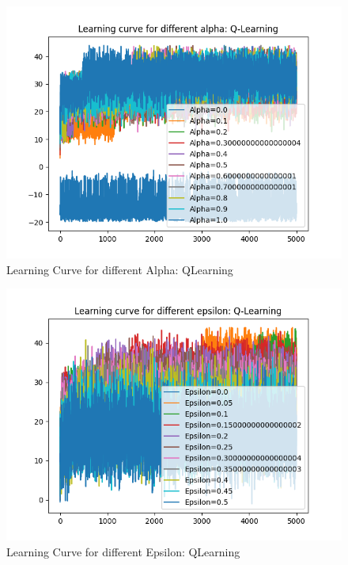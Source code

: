 \documentclass[conf]{new-aiaa}
\begin{document}
\begin{figure}[H]
\centering
\includegraphics[width=30pc]{figs/gw/alpha_sweep_qlearning.png}
\caption{Learning Curve for different Alpha: QLearning}
\label{fig_env1}
\end{figure}

\begin{figure}[H]
\centering
\includegraphics[width=30pc]{figs/gw/epsilon_sweep_qlearning.png}
\caption{Learning Curve for different Epsilon: QLearning}
\label{fig_env1}
\end{figure}
\end{document}
